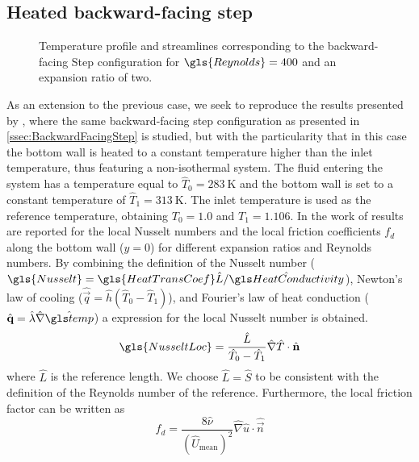 
\subsection{Heated backward-facing step}\label{ssec:HeatedBackwardFacingStep}

\begin{figure}[t]
	\centering
	\pgfplotsset{width=0.81\textwidth, compat=1.3}
	\caption{Temperature profile and streamlines corresponding to the backward-facing Step configuration for $\gls{Reynolds} = 400$ and an expansion ratio of two.} \label{fig:BFS_Temperature_Streamlines}
\end{figure}

As an extension to the previous case, we seek to reproduce the results presented by \cite{xieFluidFlowHeat2016}, where the same backward-facing step configuration as presented in \cref{ssec:BackwardFacingStep} is studied, but with the particularity that in this case the bottom wall is heated to a constant temperature higher than the inlet temperature, thus featuring a non-isothermal system. The fluid entering the system has a temperature equal to $\hat T_0 = \SI{283}{\kelvin}$ and the bottom wall is set to a constant temperature of $\hat T_1 =\SI{313}{\kelvin}$. The inlet temperature is used as the reference temperature, obtaining $T_0 = 1.0$ and $T_1 = 1.106$.
In the work of \cite{xieFluidFlowHeat2016} results are reported for the local Nusselt numbers and the local friction coefficients $f_d$  along the bottom wall ($y = 0$) for different expansion ratios and Reynolds numbers.
By combining the definition of the Nusselt number ($\gls{Nusselt} = \gls{HeatTransCoef}\hat{L}/\glsHat{HeatConductivity}$), Newton's law of cooling ($\hat{\vec{q}} = \hat{h} (\hat{T}_0 - \hat{T}_1 )$), and Fourier's law of heat conduction ($\hat{\vec{q}} = \hat \lambda \hat{\nabla} \glsHat{temp}$) a expression for the local Nusselt number is obtained.
\begin{equation}
	\gls{NusseltLoc} = \frac{\hat L}{\hat T_0-\hat T_1}\hat \nabla \hat T \cdot \hat {\vec{n}}
\end{equation}
where $\hat L$ is the reference length. We choose $ \hat L = \hat S$ to be consistent with the definition of the Reynolds number of the reference. Furthermore, the local friction factor can be written as %
\begin{equation}
	f_d = \frac{8\hat \nu} { (\hat U_{\text{mean}})^2}  \hat \nabla \hat u \cdot \hat {\vec{n}}
\end{equation}

